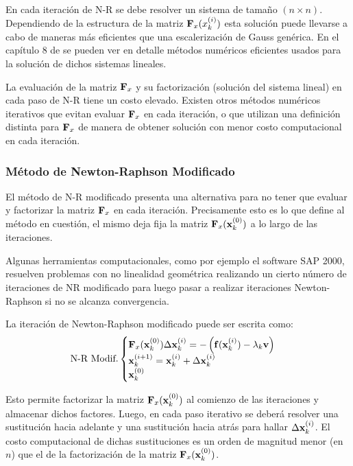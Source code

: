 En cada iteración de N-R se debe resolver un sistema de tamaño $(n \times n)$. Dependiendo de la estructura de la matriz ${\bf F}_x(x_k^{(i)})$ esta solución puede llevarse a cabo de maneras más eficientes que una escalerización de Gauss genérica. En el capítulo 8 de \citep{Bathe2014} se pueden ver en detalle métodos numéricos eficientes usados para la solución de dichos sistemas lineales.

La evaluación de la matriz ${\bf F}_x$ y su factorización (solución del sistema lineal) en cada paso de N-R tiene un costo elevado. Existen otros métodos numéricos iterativos que evitan evaluar ${\bf F}_x$ en cada iteración, o que utilizan una definición distinta para ${\bf F}_x$ de manera de obtener solución con menor costo computacional en cada iteración.

\subsubsection{Método de Newton-Raphson Modificado}

El método de N-R modificado presenta una alternativa para no tener que evaluar y factorizar la matriz ${\bf F}_x$ en cada iteración. Precisamente esto es lo que define al método en cuestión, el mismo deja fija la matriz ${\bf F}_x({\bf x}_k^{(0)})$ a lo largo de las iteraciones.

Algunas herramientas computacionales, como por ejemplo el software SAP 2000\textsuperscript{\textregistered}, resuelven problemas con no linealidad geométrica realizando un cierto número de iteraciones de NR modificado para luego pasar a realizar iteraciones Newton-Raphson si no se alcanza convergencia.

La iteración de Newton-Raphson modificado puede ser escrita como:
%
\begin{equation}\label{NRM}
\text{N-R Modif.}
\begin{cases} 
{\bf F}_x({\bf x}_k^{(0)})\Delta {\bf x}_k^{(i)} =-\left({\bf f}({\bf x}_k^{(i)})-\lambda_k {\bf v}\right)\\
{\bf x}_k^{(i+1)}={\bf x}_k^{(i)}+\Delta {\bf x}_k^{(i)} \\
{\bf x}_k^{(0)}
\end{cases}
\end{equation}

Esto permite factorizar la matriz ${\bf F}_x({\bf x}_k^{(0)})$ al comienzo de las iteraciones y almacenar dichos factores. Luego, en cada paso iterativo se deberá resolver una sustitución hacia adelante y una sustitución hacia atrás para hallar $\Delta {\bf x}_k^{(i)}$. El costo computacional de dichas sustituciones es un orden de magnitud menor (en $n$) que el de la factorización de la matriz ${\bf F}_x({\bf x}_k^{(0)})$.

